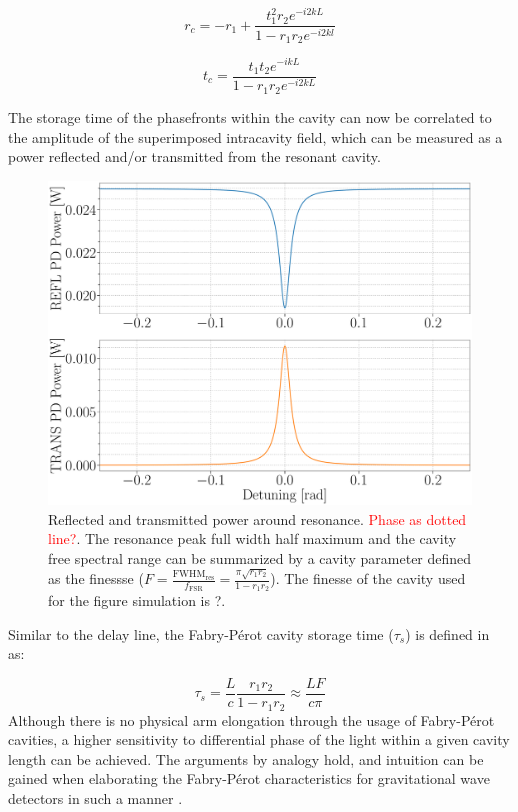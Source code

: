 \begin{equation}
	r_c = -r_1 + \frac{t^2_1r_2 e^{-i2kL}}{1-r_1 r_2 e^{-i2kl}}
\end{equation}

\begin{equation}
	t_c = \frac{t_1 t_2 e^{-ikL}}{1-r_1 r_2 e^{-i2kL}}	
\end{equation}

The storage time of the phasefronts within the cavity can now be correlated to the amplitude of the superimposed intracavity field, which can be measured as a power reflected and/or transmitted from the resonant cavity. 

\begin{figure}[H]
\includegraphics[width=\textwidth]{figs/ALGAAS/DC_power_cav_resonance.pdf}
\caption{Reflected and transmitted power around resonance. \textcolor{red}{Phase as dotted line?}. The resonance peak full width half maximum and the cavity free spectral range can be summarized by a cavity parameter defined as the finessse ($F = \frac{\mathrm{FWHM}_\mathrm{res}}{f_\mathrm{FSR}} = \frac{\pi \sqrt{r_1 r_2}}{1-r_1 r_2}$). The finesse of the cavity used for the figure simulation is ?.}
\label{fig:cav_length_response_DCpow}
\end{figure}

Similar to the delay line, the Fabry-P\'{e}rot cavity storage time ($\tau_s$) is defined in ~\cite{saulson2017} as:

\begin{equation}
	\tau_s = \frac{L}{c} \frac{r_1r_2}{1-r_1r_2} \approx \frac{L F}{c \pi}
\end{equation}
Although there is no physical arm elongation through the usage of Fabry-P\'{e}rot cavities, a higher sensitivity to differential phase of the light within a given cavity length can be achieved. The arguments by analogy hold, and intuition can be gained when elaborating the Fabry-P\'{e}rot characteristics for gravitational wave detectors in such a manner \cite{saulson97}.

